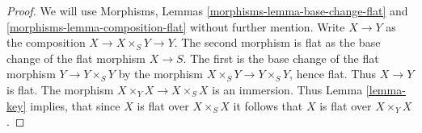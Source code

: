 \documentclass[10pt,a4paper]{amsart}
\theoremstyle{plain}
\theoremstyle{definition}
\theoremstyle{remark}
\numberwithin{equation}{subsection}
\begin{document}
\begin{proof}
We will use Morphisms, Lemmas \ref{morphisms-lemma-base-change-flat} and
\ref{morphisms-lemma-composition-flat} without further mention.
Write $X \to Y$ as the composition $X \to X \times_S Y \to Y$.
The second morphism is flat as the base change of the flat morphism
$X \to S$. The first is the base change of the flat morphism
$Y \to Y \times_S Y$ by the morphism $X \times_S Y \to Y \times_S Y$,
hence flat. Thus $X \to Y$ is flat. The morphism
$X \times_Y X \to X \times_S X$ is an immersion.
Thus Lemma \ref{lemma-key} implies, that since
$X$ is flat over $X \times_S X$ it follows that $X$ is
flat over $X \times_Y X$.
\end{proof}
\end{document}
